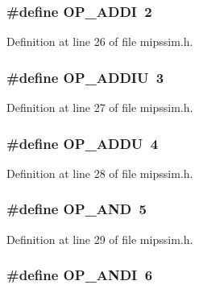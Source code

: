 \subsubsection[{O\+P\+\_\+\+A\+D\+DI}]{\setlength{\rightskip}{0pt plus 5cm}\#define O\+P\+\_\+\+A\+D\+DI~2}\label{mipssim_8h_ac67afa9250cf4f5fef70a0d0c5eae171}


Definition at line 26 of file mipssim.\+h.

\subsubsection[{O\+P\+\_\+\+A\+D\+D\+IU}]{\setlength{\rightskip}{0pt plus 5cm}\#define O\+P\+\_\+\+A\+D\+D\+IU~3}\label{mipssim_8h_af9190e9c6a890df0a23885067220979a}


Definition at line 27 of file mipssim.\+h.

\subsubsection[{O\+P\+\_\+\+A\+D\+DU}]{\setlength{\rightskip}{0pt plus 5cm}\#define O\+P\+\_\+\+A\+D\+DU~4}\label{mipssim_8h_a562daca2ed0cbde7ee4fe9cc097966bd}


Definition at line 28 of file mipssim.\+h.

\subsubsection[{O\+P\+\_\+\+A\+ND}]{\setlength{\rightskip}{0pt plus 5cm}\#define O\+P\+\_\+\+A\+ND~5}\label{mipssim_8h_ac56577e3b08d3c7453db5d81d96bf05b}


Definition at line 29 of file mipssim.\+h.

\subsubsection[{O\+P\+\_\+\+A\+N\+DI}]{\setlength{\rightskip}{0pt plus 5cm}\#define O\+P\+\_\+\+A\+N\+DI~6}\label{mipssim_8h_a9f6c17ca2244a443bb1af28fd1ceea3d}


